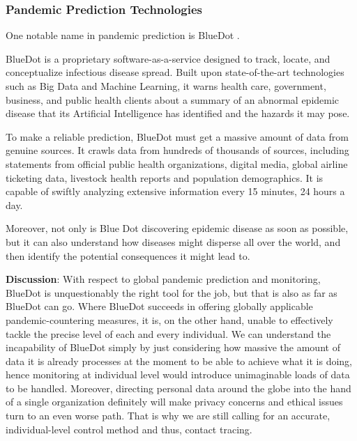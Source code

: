       \subsubsection{Pandemic Prediction Technologies}
        \par One notable name in pandemic prediction is BlueDot \parencite{BlueDotHome} \parencite{BlueDotCNBC}.
        \par BlueDot is a proprietary software-as-a-service designed to track, locate, and conceptualize infectious disease spread. Built upon state-of-the-art technologies such as Big Data and Machine Learning, it warns health care, government, business, and public health clients about a summary of an abnormal epidemic disease that its Artificial Intelligence has identified and the hazards it may pose.
        \par To make a reliable prediction, BlueDot must get a massive amount of data from genuine sources. It crawls data from hundreds of thousands of sources, including statements from official public health organizations, digital media, global airline ticketing data, livestock health reports and population demographics. It is capable of swiftly analyzing extensive information every 15 minutes, 24 hours a day.
        \par Moreover, not only is Blue Dot discovering epidemic disease as soon as possible, but it can also understand how diseases might disperse all over the world, and then identify the potential consequences it might lead to.
        \par \textbf{Discussion}: With respect to global pandemic prediction and monitoring, BlueDot is unquestionably the right tool for the job, but that is also as far as BlueDot can go. Where BlueDot succeeds in offering globally applicable pandemic-countering measures, it is, on the other hand, unable to effectively tackle the precise level of each and every individual. We can understand the incapability of BlueDot simply by just considering how massive the amount of data it is already processes at the moment to be able to achieve what it is doing, hence monitoring at individual level would introduce unimaginable loads of data to be handled. Moreover, directing personal data around the globe into the hand of a single organization definitely will make privacy concerns and ethical issues turn to an even worse path. That is why we are still calling for an accurate, individual-level control method and thus, contact tracing.

